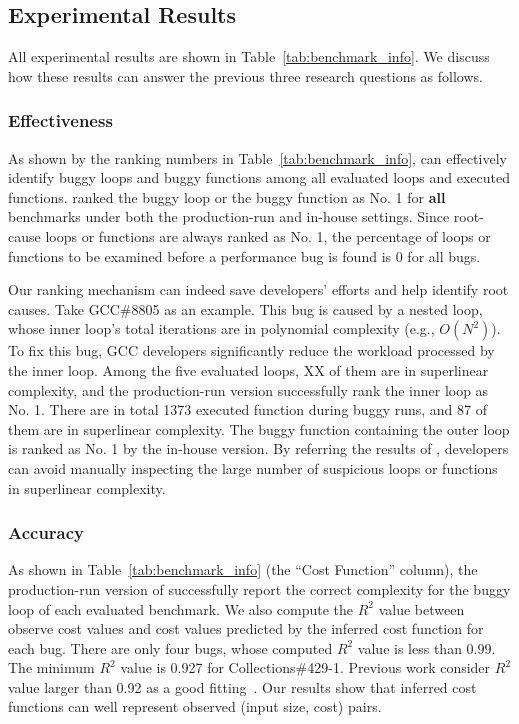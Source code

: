\subsection{Experimental Results}
\label{sec:results}

All experimental results are shown in Table~\ref{tab:benchmark_info}.
We discuss how these results can answer the previous three research questions as follows.


\subsubsection{Effectiveness}
As shown by the ranking numbers in Table~\ref{tab:benchmark_info},
\Tool can effectively identify buggy loops and buggy functions 
among all evaluated loops and executed functions. 
\Tool ranked the buggy loop or the buggy function as No. 1 
for \textbf{all} benchmarks under both the production-run and in-house settings. 
Since root-cause loops or functions are always ranked as No. 1, 
the percentage of loops or functions to be examined before a performance bug is found is 0
for all bugs. 

Our ranking mechanism can indeed save developers' efforts 
and help identify root causes. 
Take GCC\#8805 as an example.
This bug is caused by a nested loop, 
whose inner loop's total iterations are in polynomial complexity (e.g., $O(N^2)$).
To fix this bug, GCC developers significantly reduce 
the workload processed by the inner loop. 
Among the five evaluated loops, {\color{red} XX} of them are in superlinear complexity, 
and the production-run version successfully rank the inner loop as No. 1.
There are in total 1373 executed function during buggy runs,
and 87 of them are in superlinear complexity. 
The buggy function containing the outer loop is ranked as No. 1 
by the in-house version. 
By referring the results of \Tool, 
developers can avoid manually inspecting the large number of  
suspicious loops or functions in superlinear complexity. 

\subsubsection{Accuracy}
As shown in Table~\ref{tab:benchmark_info} (the ``Cost Function'' column),
the production-run version of \Tool successfully 
report the correct complexity for the buggy loop of 
each evaluated benchmark. 
We also compute the $R^2$ value between observe cost values and 
cost values predicted by the inferred cost function for each bug.  
There are only four bugs, whose computed $R^2$ value is less than $0.99$.
The minimum $R^2$ value is 0.927 for Collections\#429-1. 
Previous work consider $R^2$ value larger than 0.92 
as a good fitting~\cite{rsquare-value}.
Our results show that inferred cost functions can well represent 
observed (input size, cost) pairs. 


